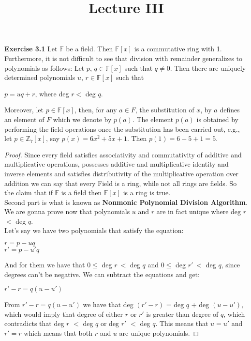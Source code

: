 \documentclass[a4paper]{article}
\title{\vspace{-2cm}Lecture III\vspace{-2cm}}
\date{}
\begin{document}
\maketitle
\noindent \textbf{Exercise 3.1} Let $\mathbb{F}$ be a field. Then $\mathbb{F}[x]$ is a commutative ring with 1. Furthermore, it is not difficult to see that division with remainder generalizes to polynomials as follows: Let $p$, $q \in \mathbb{F}[x]$ such that $q \neq0$. Then there are uniquely determined polynomials $u$, $r \in \mathbb{F}[x]$ such that
\begin{center}
$p = uq + r$, where deg $r<$ deg $q$.	
\end{center}
Moreover, let $p \in \mathbb{F}[x]$, then, for any $a \in F$, the substitution of $x$, by $a$ defines an element of $F$ which we denote by $p(a)$. The element $p(a)$ is obtained by performing the field operations once the substitution has been carried out, e.g., let $p \in \mathbb{Z}_{7}[x]$, say $p(x) = 6x^{2} + 5x + 1$. Then $p(1) = 6 + 5 + 1 = 5$.
\begin{proof}
Since every field satisfies associativity and commutativity of additive and multiplicative operations, possesses additive and multiplicative identity and inverse elements and satisfies distributivity of the multiplicative operation over addition we can say that every Field is a ring, while not all rings are fields. So the claim that if $\mathbb{F}$ is a field then $\mathbb{F}[x]$ is a ring is true.\\
Second part is what is known as \textbf{Nonmonic Polynomial Division Algorithm}. We are gonna prove now that polynomials $u$ and $r$ are in fact unique where deg $r$ $<$ deg $q$.\\
Let's say we have two polynomials that satisfy the equation:
\begin{center}
$r = p - uq$\\
$r' = p - u'q$	
\end{center}
And for them we have that $0 \leq $ deg $r\ <$ deg $q$ and $0 \leq $ deg $r'\ <$ deg $q$, since degrees can't be negative. We can subtract the equations and get:
\begin{center}
$r' - r	= q(u - u')$
\end{center}
From $r' - r	= q(u - u')$ we have that deg $(r' - r)$ = deg $q$ + deg $(u - u')$, which would imply that degree of either $r$ or $r'$ is greater than degree of $q$, which contradicts that deg $r$ $<$ deg $q$ or deg $r'$ $<$ deg $q$. This means that $u=u'$ and $r'=r$ which means that both $r$ and $u$ are unique polynomials.

\end{proof}
\end{document}
